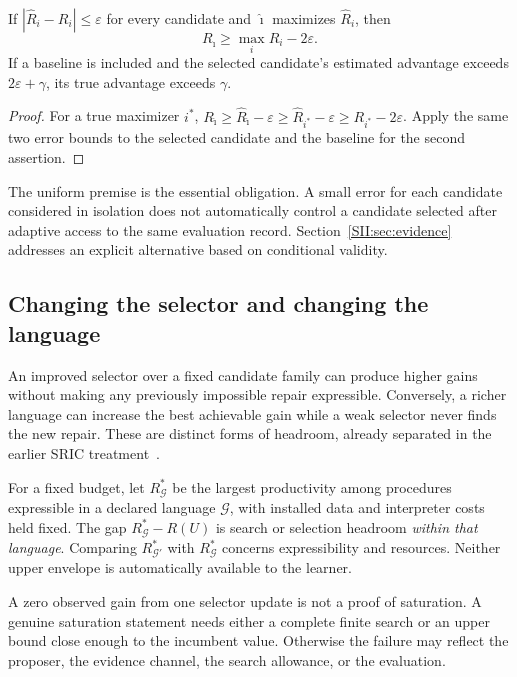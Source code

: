 \begin{SIIproposition}\label{SII:prop:selection}
If $|\widehat R_i-R_i|\leq\varepsilon$ for every candidate and $\hat\imath$ maximizes $\widehat R_i$, then
\[
R_{\hat\imath}\geq \max_iR_i-2\varepsilon.
\]
If a baseline is included and the selected candidate's estimated advantage exceeds $2\varepsilon+\gamma$, its true advantage exceeds $\gamma$.
\end{SIIproposition}
\begin{proof}
For a true maximizer $i^*$,
$R_{\hat\imath}\geq\widehat R_{\hat\imath}-\varepsilon
\geq\widehat R_{i^*}-\varepsilon
\geq R_{i^*}-2\varepsilon$.
Apply the same two error bounds to the selected candidate and the baseline for the second assertion.
\end{proof}

The uniform premise is the essential obligation. A small error for each candidate considered in isolation does not automatically control a candidate selected after adaptive access to the same evaluation record. Section~\ref{SII:sec:evidence} addresses an explicit alternative based on conditional validity.

\subsection{Changing the selector and changing the language}
An improved selector over a fixed candidate family can produce higher gains without making any previously impossible repair expressible. Conversely, a richer language can increase the best achievable gain while a weak selector never finds the new repair. These are distinct forms of headroom, already separated in the earlier SRIC treatment~\cite{SII:sric}.

For a fixed budget, let $R^*_{\mathcal G}$ be the largest productivity among procedures expressible in a declared language $\mathcal G$, with installed data and interpreter costs held fixed. The gap $R^*_{\mathcal G}-R(U)$ is search or selection headroom \emph{within that language}. Comparing $R^*_{\mathcal G'}$ with $R^*_{\mathcal G}$ concerns expressibility and resources. Neither upper envelope is automatically available to the learner.

A zero observed gain from one selector update is not a proof of saturation. A genuine saturation statement needs either a complete finite search or an upper bound close enough to the incumbent value. Otherwise the failure may reflect the proposer, the evidence channel, the search allowance, or the evaluation.

